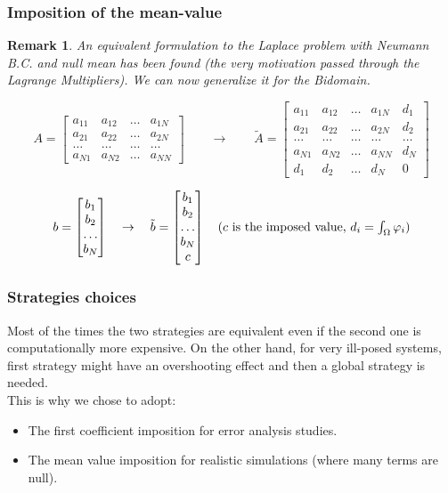 \documentclass[8pt]{beamer}
\newtheorem*{remark}{Remark}
\begin{document}
\begin{frame}
\frametitle{Imposition of the mean-value}
\begin{remark}
	An equivalent formulation to the Laplace problem with Neumann B.C. and null mean has been found (the very motivation passed through the Lagrange Multipliers). We can now generalize it for the Bidomain.
\end{remark}
\begin{equation*}
A=\begin{bmatrix}
a_{11} & a_{12} & \dots & a_{1N} \\ 
a_{21} & a_{22} & \dots & a_{2N} \\ 
\dots & \dots & \dots & \dots \\
a_{N1}  & a_{N2} & \dots & a_{NN}
\end{bmatrix} \quad \quad \rightarrow
\quad \quad \tilde{A}=\begin{bmatrix}
a_{11} & a_{12} & \dots & a_{1N} & d_1\\ 
a_{21} & a_{22} & \dots & a_{2N} & d_2 \\ 
\dots & \dots & \dots & \dots & \dots \\
a_{N1}  & a_{N2} & \dots & a_{NN} & d_N \\
d_1 & d_2 & \dots & d_N & 0
\end{bmatrix}
\end{equation*}

\begin{equation*}
b=\begin{bmatrix}
b_1 \\ b_2 \\ \dots \\ b_N
\end{bmatrix} \quad \rightarrow \quad
\tilde{b}=\begin{bmatrix}
b_1 \\ b_2 \\ \dots \\ b_N \\ c
\end{bmatrix} \quad \text{($c$ is the imposed value, $ \textstyle d_i = \int_\Omega \varphi_i$)}
\end{equation*}
\end{frame}

\begin{frame}
\frametitle{Strategies choices}
Most of the times the two strategies are equivalent even if the second one is computationally more expensive. On the other hand, for very ill-posed systems, first strategy might have an overshooting effect and then a global strategy is needed. \vspace{4mm} \\
This is why we chose to adopt:
\begin{itemize}
	\item The first coefficient imposition for error analysis studies.
	\item The mean value imposition for realistic simulations (where many terms are null).
\end{itemize}
\end{frame}
\end{document}

